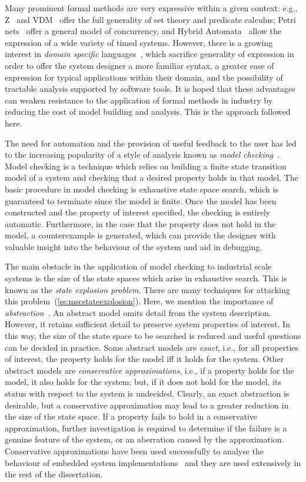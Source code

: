 Many prominent formal methods are very expressive within a given
context: e.g., Z~\cite{spi:88} and VDM~\cite{jon:90} offer the full
generality of set theory and predicate calculus; Petri
nets~\cite{mur:89} offer a general model of concurrency, and Hybrid
Automata~\cite{hen:96} allow the expression of a wide variety of timed
systems. However, there is a growing interest in \emph{domain
specific} languages~\cite{jw:96}, which sacrifice generality of
expression in order to offer the system designer a more familiar
syntax, a greater ease of expression for typical applications within
their domain, and the possibility of tractable analysis supported by
software tools. It is hoped that these advantages can weaken resistance to 
the application of formal methods in industry by reducing the cost of 
model building and analysis. This is the approach followed here.

The need for automation and the provision of useful feedback to the user
has led to the increasing popularity of a style of analysis known as
\emph{model checking}~\cite{cgp:99}. Model checking is a technique which
relies on building a finite state transition model of a system and
checking that a desired property holds in that model. The basic
procedure in model checking is exhaustive state space search, which is
guaranteed to terminate since the model is finite. Once the model has
been constructed and the property of interest specified, the checking
is entirely automatic.  Furthermore, in the case that the property
does not hold in the model, a counterexample is generated, which can
provide the designer with valuable insight into the behaviour of the
system and aid in debugging.

The main obstacle in the application of model checking to industrial
scale systems is the size of the state spaces which arise in
exhaustive search.  This is known as the \emph{state explosion
problem}. There are many techniques for attacking this
problem~(\Sec\ref{ss:mscstateexplosion}). Here, we mention the
importance of \emph{abstraction}~\cite{lgs:95}. An abstract model
omits detail from the system description. However, it retains
sufficient detail to preserve system properties of interest. In this
way, the size of the state space to be searched is reduced and useful
questions can be decided in practice. Some abstract models are
\emph{exact}, i.e., for all properties of interest, the property holds
for the model iff it holds for the system. Other abstract models are
\emph{conservative approximations}, i.e., if a property holds for the
model, it also holds for the system; but, if it does not hold for the
model, its status with respect to the system is undecided. Clearly, an
exact abstraction is desirable, but a conservative approximation may
lead to a greater reduction in the size of the state space. If a
property fails to hold in a conservative approximation, further
investigation is required to determine if the failure is a genuine
feature of the system, or an aberration caused by the approximation.
Conservative approximations have been used successfully to analyse the
behaviour of embedded system implementations~\cite{bhkr:94b,cor:96} and
they are used extensively in the rest of the dissertation. 

